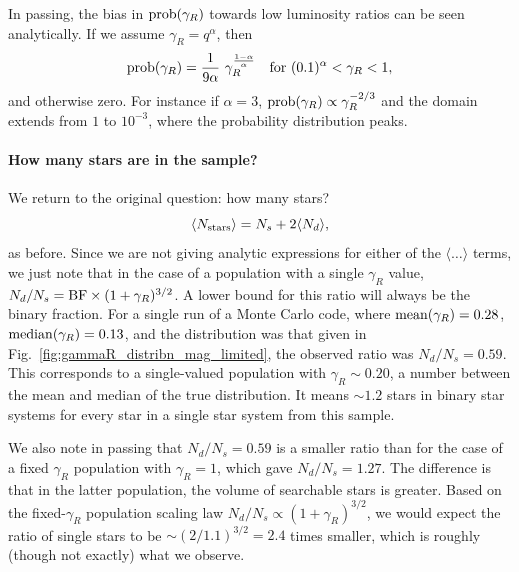 \documentclass{emulateapj}
\begin{document}
In passing, the bias in ${\rm prob}(\gamma_R)$ towards low luminosity ratios 
can be seen analytically. If we assume $\gamma_R = q^\alpha$, then
\begin{equation}
{\rm prob}(\gamma_R) = \frac{1}{9 \alpha} \ \gamma_R^{\frac{1-\alpha}{\alpha}}
\quad {\rm for\ } (0.1)^\alpha < \gamma_R < 1,
\end{equation}
and otherwise zero. For instance if $\alpha = 3$, ${\rm prob}(\gamma_R) 
\propto \gamma_R^{-2/3}$ and the domain extends from $1$ to 
$10^{-3}$, where the probability distribution peaks.







\paragraph{How many stars are in the sample?}

We return to the original question: how many stars?
\begin{equation}
\langle N_{\rm stars} \rangle = N_s + 2 \langle N_d \rangle,
\end{equation}
as before.
Since we are not giving analytic expressions for either of the $\langle \ldots 
\rangle$ terms, we just note that in the case of a population with a single 
$\gamma_R$ value, $N_d/N_s = {\rm BF} \times (1 + \gamma_R)^{3/2}$. A lower
bound for this ratio will always be the binary fraction.
For a single run of a Monte Carlo code, where ${\rm mean}(\gamma_R) = 0.28$, 
${\rm median}(\gamma_R) = 0.13$, and the distribution was that given in 
Fig.~\ref{fig:gammaR_distribn_mag_limited}, the observed ratio was $N_d/N_s = 
0.59$.
This corresponds to a single-valued population with $\gamma_R \sim 0.20$, a
number between the mean and median of the true distribution.
It means $\sim 1.2$ stars in binary star systems for every star in a single 
star system from this sample.

We also note in passing that $N_d/N_s = 0.59$ is a smaller ratio than for the 
case of a fixed $\gamma_R$ population with $\gamma_R = 1$, which gave $N_d/N_s 
= 1.27$. The difference is that in the latter population, the volume of 
searchable stars is greater. Based on the fixed-$\gamma_R$ population scaling 
law $N_d / N_s \propto (1+\gamma_R)^{3/2}$, we 
would expect the ratio of single stars to be $\sim (2/1.1)^{3/2} = 2.4$ 
times smaller, which is roughly (though not exactly) what we observe.
\end{document}
